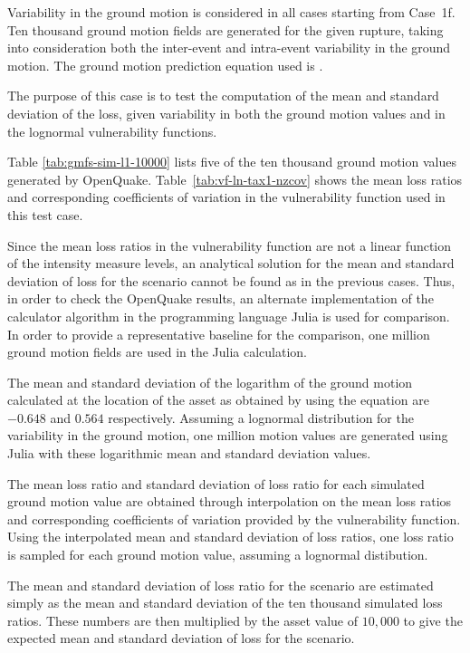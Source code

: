 Variability in the ground motion is considered in all cases starting from Case~1f. Ten thousand ground motion fields are generated for the given rupture, taking into consideration both the inter-event and intra-event variability in the ground motion. The ground motion prediction equation used is \citet{boore2008}.

The purpose of this case is to test the computation of the mean and standard deviation of the loss, given variability in both the ground motion values and in the lognormal vulnerability functions.



Table \ref{tab:gmfs-sim-l1-10000} lists five of the ten thousand ground motion values generated by OpenQuake. Table~\ref{tab:vf-ln-tax1-nzcov} shows the mean loss ratios and corresponding coefficients of variation in the vulnerability function used in this test case.

Since the mean loss ratios in the vulnerability function are not a linear function of the intensity measure levels, an analytical solution for the mean and standard deviation of loss for the scenario cannot be found as in the previous cases. Thus, in order to check the OpenQuake results, an alternate implementation of the calculator algorithm in the programming language Julia is used for comparison. In order to provide a representative baseline for the comparison, one million ground motion fields are used in the Julia calculation.

The mean and standard deviation of the logarithm of the ground motion calculated at the location of the asset as obtained by using the \citet{boore2008} equation are $-0.648$ and $0.564$ respectively. Assuming a lognormal distribution for the variability in the ground motion, one million motion values are generated using Julia with these logarithmic mean and standard deviation values.

The mean loss ratio and standard deviation of loss ratio for each simulated ground motion value are obtained through interpolation on the mean loss ratios and corresponding coefficients of variation provided by the vulnerability function. Using the interpolated mean and standard deviation of loss ratios, one loss ratio is sampled for each ground motion value, assuming a lognormal distibution.

The mean and standard deviation of loss ratio for the scenario are estimated simply as the mean and standard deviation of the ten thousand simulated loss ratios. These numbers are then multiplied by the asset value of $10,000$ to give the expected mean and standard deviation of loss for the scenario.
